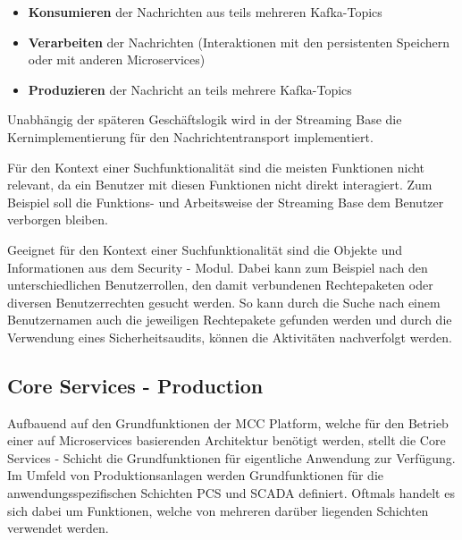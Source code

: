 \begin{description}
    \begin{itemize}
        \item \textbf{Konsumieren} der Nachrichten aus teils mehreren Kafka-Topics
        \item \textbf{Verarbeiten} der Nachrichten (Interaktionen mit den persistenten Speichern oder mit anderen Microservices)
        \item \textbf{Produzieren} der Nachricht an teils mehrere Kafka-Topics
    \end{itemize}

    Unabhängig der späteren Geschäftslogik wird in der \glqq Streaming Base\grqq{} die Kernimplementierung für den Nachrichtentransport implementiert.
    



\end{description}

Für den Kontext einer Suchfunktionalität sind die meisten Funktionen nicht relevant, da ein Benutzer mit diesen Funktionen nicht direkt interagiert. Zum Beispiel soll die Funktions- und Arbeitsweise der \glqq Streaming Base\grqq{} dem Benutzer verborgen bleiben.

Geeignet für den Kontext einer Suchfunktionalität sind die Objekte und Informationen aus dem \glqq Security\grqq{} - Modul. Dabei kann zum Beispiel nach den unterschiedlichen Benutzerrollen, den damit verbundenen Rechtepaketen oder diversen Benutzerrechten gesucht werden. So kann durch die Suche nach einem Benutzernamen auch die jeweiligen Rechtepakete gefunden werden und durch die Verwendung eines Sicherheitsaudits, können die Aktivitäten nachverfolgt werden.


\subsection{Core Services - Production\label{subsec3.1.2:Unterunterpunkt-2}}

Aufbauend auf den Grundfunktionen der \glqq MCC Platform\grqq{}, welche für den Betrieb einer auf Microservices basierenden Architektur benötigt werden, stellt die \glqq Core Services\grqq{} - Schicht die Grundfunktionen für eigentliche Anwendung zur Verfügung. Im Umfeld von Produktionsanlagen werden Grundfunktionen für die anwendungsspezifischen Schichten \glqq PCS\grqq{} und \glqq SCADA\grqq{} definiert. Oftmals handelt es sich dabei um Funktionen, welche von mehreren darüber liegenden Schichten verwendet werden.

